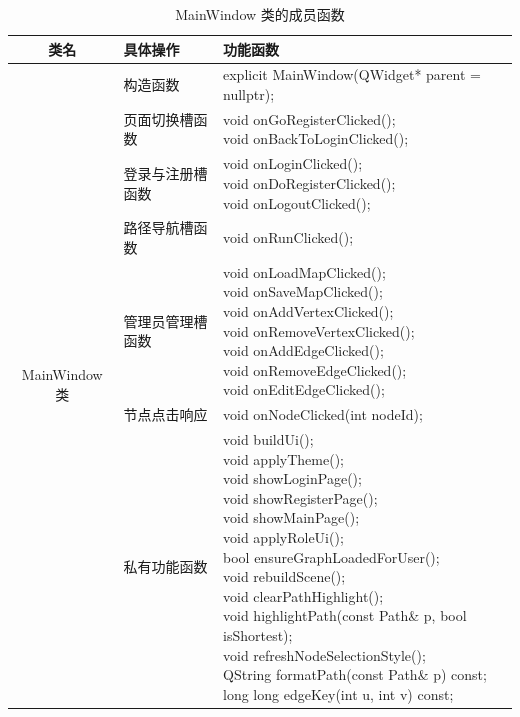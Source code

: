 \documentclass[UTF8,12pt,a4paper]{ctexart}
\begin{document}
\begin{table}[H]
\centering
\caption{MainWindow 类的成员函数}
\renewcommand{\arraystretch}{1.3}
\begin{tabular}{|
c|
>{\centering\arraybackslash}m{4cm}|
>{\centering\arraybackslash}m{9cm}|}
\hline
\textbf{类名} & \textbf{具体操作} & \textbf{功能函数} \\
\hline
\multirow{7}{*}{MainWindow 类}
& 构造函数
& explicit MainWindow(QWidget* parent = nullptr); \\
\cline{2-3}

& 页面切换槽函数
& {\centering
  void onGoRegisterClicked(); \\[0.5ex]
  void onBackToLoginClicked();
}\\
\cline{2-3}

& 登录与注册槽函数
& {\centering
  void onLoginClicked(); \\[0.5ex]
  void onDoRegisterClicked(); \\[0.5ex]
  void onLogoutClicked();
}\\
\cline{2-3}

& 路径导航槽函数
& void onRunClicked(); \\
\cline{2-3}

& 管理员管理槽函数
& {\centering
  void onLoadMapClicked(); \\[0.5ex]
  void onSaveMapClicked(); \\[0.5ex]
  void onAddVertexClicked(); \\[0.5ex]
  void onRemoveVertexClicked(); \\[0.5ex]
  void onAddEdgeClicked(); \\[0.5ex]
  void onRemoveEdgeClicked(); \\[0.5ex]
  void onEditEdgeClicked();
}\\
\cline{2-3}

& 节点点击响应
& void onNodeClicked(int nodeId); \\
\cline{2-3}

& 私有功能函数
& {\centering
  void buildUi(); \\[0.5ex]
  void applyTheme(); \\[0.5ex]
  void showLoginPage(); \\[0.5ex]
  void showRegisterPage(); \\[0.5ex]
  void showMainPage(); \\[0.5ex]
  void applyRoleUi(); \\[0.5ex]
  bool ensureGraphLoadedForUser(); \\[0.5ex]
  void rebuildScene(); \\[0.5ex]
  void clearPathHighlight(); \\[0.5ex]
  void highlightPath(const Path\& p, bool isShortest); \\[0.5ex]
  void refreshNodeSelectionStyle(); \\[0.5ex]
  QString formatPath(const Path\& p) const; \\[0.5ex]
  long long edgeKey(int u, int v) const;
}\\
\hline
\end{tabular}
\end{table}
\end{document}
